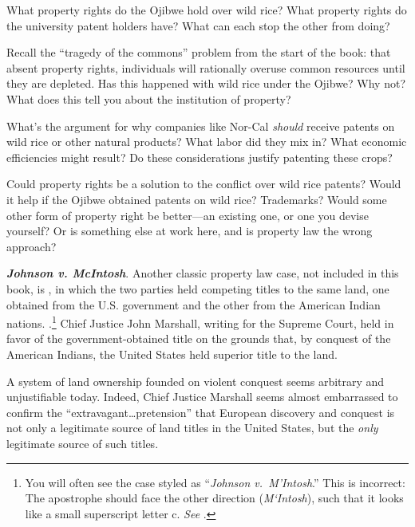 \item What property rights do the Ojibwe hold over wild rice? What property
rights do the university patent holders have? What can each stop the other from
doing?

\item Recall the ``tragedy of the commons'' problem from the start of the book:
that absent property rights, individuals will rationally overuse common
resources until they are depleted. Has this happened with wild rice under the
Ojibwe? Why not? What does this tell you about the institution of property?

\item What's the argument for why companies like Nor-Cal \emph{should} receive
patents on wild rice or other natural products? What labor did they mix in? What
economic efficiencies might result? Do these considerations justify patenting
these crops?

\item Could property rights be a solution to the conflict over wild rice
patents? Would it help if the Ojibwe obtained patents on wild rice? Trademarks?
Would some other form of property right be better---an existing one, or one you
devise yourself? Or is something else at work here, and is property law the
wrong approach?



\item \textbf{\emph{Johnson v. McIntosh}}. Another classic property law case,
not included in this book, is , in which the two
parties held competing titles to the same land, one obtained from the U.S.
government and the other from the American Indian nations.
.\footnote{You will often see the case styled as
``\emph{Johnson v.~M'Intosh}.'' This is incorrect: The apostrophe should face
the other direction (\emph{M`Intosh}), such that it looks like a small
superscript letter c. \emph{See} .}
Chief Justice John Marshall, writing for the Supreme Court, held in favor of the
government-obtained title on the grounds that, by conquest of the American
Indians, the United States held superior title to the land.

A system of land ownership founded on violent conquest seems arbitrary and
unjustifiable today. Indeed, Chief Justice Marshall seems almost embarrassed to
confirm the ``extravagant\ldots pretension'' that European discovery and
conquest is not only a legitimate source of land titles in the United States,
but the \textit{only} legitimate source of such titles.

